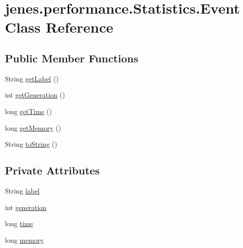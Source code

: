 \hypertarget{classjenes_1_1performance_1_1_statistics_1_1_event}{\section{jenes.\-performance.\-Statistics.\-Event Class Reference}
\label{classjenes_1_1performance_1_1_statistics_1_1_event}
}
\subsection*{Public Member Functions}
\begin{DoxyCompactItemize}
\item 
String \hyperlink{classjenes_1_1performance_1_1_statistics_1_1_event_ac31d1143b293ddf1588a9001b3e93aaf}{get\-Label} ()
\item 
int \hyperlink{classjenes_1_1performance_1_1_statistics_1_1_event_a3ea941c63fdb0980580f21f23be9048e}{get\-Generation} ()
\item 
long \hyperlink{classjenes_1_1performance_1_1_statistics_1_1_event_ac91e5a9610910695b6f1afdef97a0965}{get\-Time} ()
\item 
long \hyperlink{classjenes_1_1performance_1_1_statistics_1_1_event_a21a457ac37bcb50c88fe7109dd81e223}{get\-Memory} ()
\item 
String \hyperlink{classjenes_1_1performance_1_1_statistics_1_1_event_a28db20dc12dd966ed0856c89242f0569}{to\-String} ()
\end{DoxyCompactItemize}
\subsection*{Private Attributes}
\begin{DoxyCompactItemize}
\item 
String \hyperlink{classjenes_1_1performance_1_1_statistics_1_1_event_a8aaedfe675c617485b08d99753ad6ee2}{label}
\item 
int \hyperlink{classjenes_1_1performance_1_1_statistics_1_1_event_ad61e01500be0c867a9912caeca88bcb0}{generation}
\item 
long \hyperlink{classjenes_1_1performance_1_1_statistics_1_1_event_a116b4922a3c307adfd185ae996255335}{time}
\item 
long \hyperlink{classjenes_1_1performance_1_1_statistics_1_1_event_ad302c34aad67e7e379ff55d12bf82310}{memory}
\end{DoxyCompactItemize}


